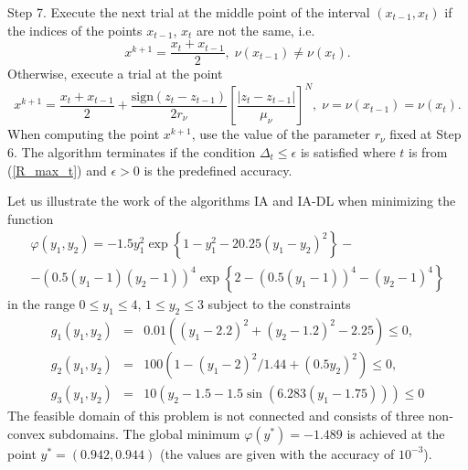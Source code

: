 \documentclass[review]{elsarticle}
\begin{document}
	Step 7. Execute the next trial at the middle point of the interval $(x_{t-1}, x_t)$ if the indices of the points $x_{t-1}$, $x_t$ are not the same, i.e.
$$
	x^{k+1} = \frac{x_t + x_{t-1}}{2}, \; \nu(x_{t-1}) \neq \nu(x_t).
$$
Otherwise, execute a trial at the point
$$
	x^{k+1} = \frac{x_t+x_{t-1}}{2} + \frac{\mathrm{sign}(z_t-z_{t-1})}{2r_\nu}\left[\frac{\left|z_t-z_{t-1}\right|}{\mu_\nu}\right]^N, \; \nu=\nu(x_{t-1})=\nu(x_t).
$$
When computing the point $x^{k+1}$, use the value of the parameter $r_{\nu}$ fixed at Step 6. The algorithm terminates if the condition $\Delta_{t} \leq \epsilon$ is satisfied where $t$ is from (\ref{R_max_t}) and $\epsilon>0$ is the predefined accuracy.

	Let us illustrate the work of the algorithms IA and IA-DL when minimizing the function
\begin{eqnarray}
	\varphi(y_1, y_2)=-1.5y_1^2\exp{\left\{1-y_1^2-20.25(y_1-y_2)^2\right\}}- \nonumber \\
	-\left(0.5(y_1-1)(y_2-1)\right)^4\exp{\left\{2-\left(0.5(y_1-1)\right)^4-(y_2-1)^4\right\}}
	\nonumber
\end{eqnarray}
in the range $0 \leq y_1 \leq 4$, $1 \leq y_2 \leq 3$ subject to the constraints
\begin{eqnarray}
	g_1(y_1, y_2) &=& 0.01 \left( (y_1-2.2)^2+(y_2-1.2)^2-2.25 \right) \leq 0, \nonumber \\
	g_2(y_1, y_2) &=& 100 \left(1-(y_1-2)^2/1.44+(0.5y_2)^2 \right) \leq 0, \nonumber \\
	g_3(y_1, y_2) &=& 10 \left( y_2 - 1.5 - 1.5 \sin{\left( 6.283(y_1-1.75) \right)}\right) \leq 0
	\nonumber
\end{eqnarray}
The feasible domain of this problem is not connected and consists of three non-convex subdomains. The global minimum $\varphi(y^\ast)=-1.489$ is achieved at the point $y^\ast =(0.942, 0.944)$ (the values are given with the accuracy of $10^{-3}$).
\end{document}
